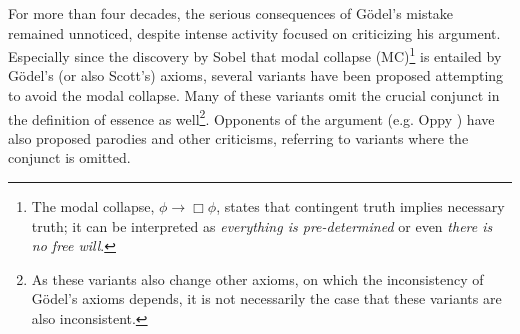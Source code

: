\documentclass{article}
\begin{document}

For more than four decades, the serious consequences of G\"odel's
mistake remained unnoticed, despite intense activity focused on
criticizing his argument. Especially since the discovery by Sobel
\cite{Sobel} that modal collapse (MC)\footnote{The modal collapse,
  $\phi\rightarrow \Box \phi$, states that contingent truth implies
  necessary truth; it can be interpreted as \textit{everything is
    pre-determined} or even \textit{there is no free will}. } is
entailed by G\"odel's (or also Scott's) axioms, several variants have
been proposed
\cite{Anderson,AndersonGettings,Hajek1,Hajek2,Hajek3,Bjordal}
attempting to avoid the modal collapse. Many of these variants omit
the crucial conjunct in the definition of essence as well\footnote{As
  these variants also change other axioms, on which the inconsistency
  of G\"odel's axioms depends, it is not necessarily the case that
  these variants are also inconsistent.}. Opponents of the argument
(e.g. Oppy \cite[p.226/227]{oppy96:_goedel_ontol_argum}
\cite[p.364]{oppy00:_respon_gettin}
\cite[p.1068]{oppy08:_higher_order_ontol_argum}) have also proposed
parodies and other criticisms, referring to variants where the
conjunct is omitted.





\end{document}
